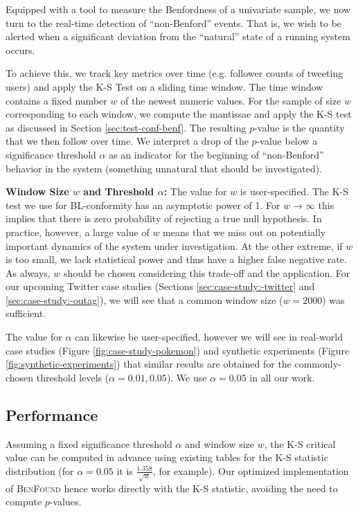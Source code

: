 \documentclass[twoside,leqno,twocolumn]{article}\usepackage[]{graphicx}\usepackage[]{color}
\newcommand{\algoname}{\textsc{BenFound}}
\begin{document}
Equipped with a tool to measure the Benfordness of a univariate sample, we now turn to the real-time detection of ``non-Benford'' events. That is, we wish to be alerted when a significant deviation from the ``natural'' state of a running system occurs. 

To achieve this, we track key metrics over time (e.g. follower counts of tweeting users) and apply the K-S Test on a sliding time window. The time window contains a fixed number $w$ of the newest numeric values. For the sample of size $w$ corresponding to each window, we compute the mantissae and apply the K-S test as discussed in Section \ref{sec:test-conf-benf}. The resulting $p$-value is the quantity that we then follow over time. We interpret a drop of the $p$-value below a significance threshold $\alpha$ as an indicator for the beginning of ``non-Benford'' behavior in the system (something unnatural that should be investigated).

\textbf{Window Size $w$ and Threshold $\alpha$:} The value for $w$ is user-specified. The K-S test we use for BL-conformity has an asymptotic power of 1. For $w \rightarrow \infty$ this implies that there is zero probability of rejecting a true null hypothesis. In practice, however, a large value of $w$ means that we miss out on potentially important dynamics of the system under investigation. At the other extreme, if $w$ is too small, we lack statistical power and thus have a higher false negative rate. As always, $w$ should be chosen considering this trade-off and the application. For our upcoming Twitter case studies (Sections \ref{sec:case-study:-twitter} and \ref{sec:case-study:-outag}), we will see that a common window size ($w=2000$) was sufficient.

The value for $\alpha$ can likewise be user-specified, however we will see in real-world case studies (Figure \ref{fig:case-study-pokemon}) and synthetic experiments (Figure \ref{fig:synthetic-experiments}) that similar results are obtained for the commonly-chosen threshold levels ($\alpha=0.01,0.05$). We use $\alpha=0.05$ in all our work.

\subsection{Performance}
\label{sec:performance}

Assuming a fixed significance threshold $\alpha$ and window size $w$, the K-S critical value can be computed in advance using existing tables for the K-S statistic distribution (for $\alpha=0.05$ it is $\frac{1.358}{\sqrt{w}}$, for example). Our optimized implementation of \algoname{} hence works directly with the K-S statistic, avoiding the need to compute $p$-values.
\end{document}
